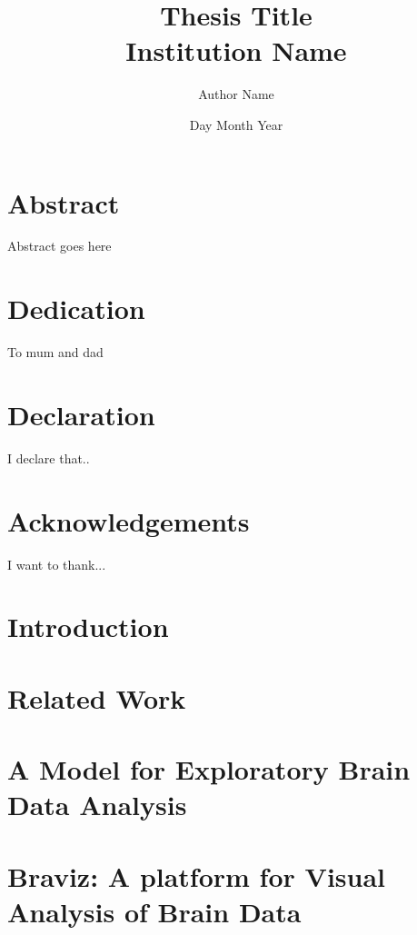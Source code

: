 \documentclass[12pt]{report}
\begin{document}
\title{
	{Thesis Title}\\
	{\large Institution Name}\\
}
\author{Author Name}
\date{Day Month Year}

\maketitle

\chapter*{Abstract}
Abstract goes here

\chapter*{Dedication}
To mum and dad

\chapter*{Declaration}
I declare that..

\chapter*{Acknowledgements}
I want to thank...

\tableofcontents

\chapter{Introduction}
\label{chap_intro}


\chapter{Related Work}
\label{chap_related}
%

\chapter{A Model for Exploratory Brain Data Analysis}
\label{chap_model}


\chapter{Braviz: A platform for Visual Analysis of Brain Data}
\label{chap_braviz}

\end{document}
